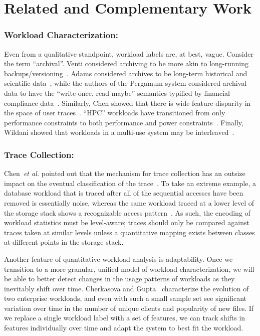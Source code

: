 
\section{Related and Complementary Work}%
\label{sec:related}

\subsubsection*{Workload Characterization: }

Even from a qualitative standpoint, workload labels are, at best, vague.
Consider the term ``archival''. Venti considered archiving to be more akin to
long-running backups/versioning~\cite{venti}. Adams \etal considered
archives to be long-term historical and scientific data~\cite{ian-tos}, while
the authors of the Pergamum system considered archival data to have the ``write-once,
read-maybe'' semantics typified by financial compliance data~\cite{storerfast2008}.
Similarly, Chen \etal showed that there is wide feature disparity in the space
of user traces~\cite{chen-kmeans}.  ``HPC'' workloads have transitioned from
only performance constraints to both performance and power
constraints~\cite{hpcpower}.  Finally, Wildani \etal showed that workloads
in a multi-use system may be interleaved~\cite{hands}. 


\subsubsection*{Trace Collection: }
Chen~\emph{et al.} pointed out that
the mechanism for trace collection has an outsize impact on the eventual
classification of the trace~\cite{chen-kmeans}.  To take an extreme
example, a database workload that is traced after all of the sequential accesses
have been removed is essentially noise, whereas the same workload traced at a
lower level of the storage stack shows a recognizable access
pattern~\cite{hands}.  As such, the encoding of workload statistics must be
level-aware; traces should only be compared against traces taken at similar
levels unless a quantitative mapping exists between classes at different points
in the storage stack.  


Another feature of quantitative workload analysis is adaptability.  Once we
transition to a more granular, unified model of workload characterization, we
will be able to better detect changes in the usage patterns of workloads as they
inevitably shift over time.  Cherkasova and Gupta~\cite{char_local} characterize the
evolution of two enterprise workloads, and even with such a small sample set see
significant variation over time in the number of unique clients and popularity
of new files.  If we replace a single workload label with a set of features, we
can track shifts in features individually over time and adapt the system to best
fit the workload.


